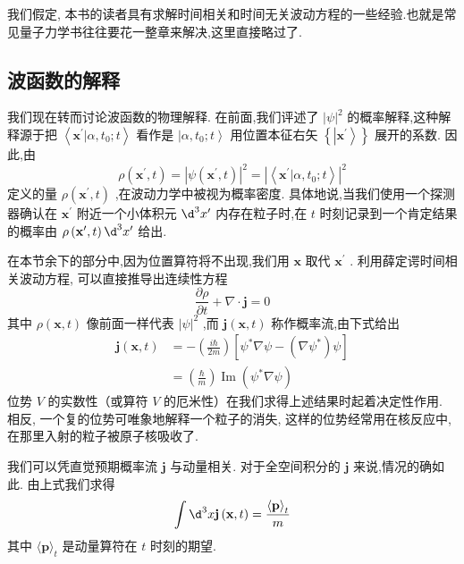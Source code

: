 我们假定, 本书的读者具有求解时间相关和时间无关波动方程的一些经验.也就是常见量子力学书往往要花一整章来解决,这里直接略过了.
\subsection{波函数的解释}
我们现在转而讨论波函数的物理解释. 在前面,我们评述了 ${\left| \psi \right| }^{2}$ 的概率解释,这种解释源于把 $\left\langle {{\mathbf{x}}^{\prime } | \alpha ,{t}_{0};t}\right\rangle$ 看作是 $\left. {| \alpha ,{t}_{0};t}\right\rangle$ 用位置本征右矢 $\left\{ \left| {\mathbf{x}}^{\prime }\right\rangle \right\}$ 展开的系数. 因此,由
\begin{equation}
\rho \left( {{\mathbf{x}}^{\prime }, t}\right) = {\left| \psi \left( {\mathbf{x}}^{\prime }, t\right) \right| }^{2} = {\left| \left\langle {\mathbf{x}}^{\prime } | \alpha ,{t}_{0};t\right\rangle \right| }^{2}
\end{equation}
定义的量 $\rho \left( {{\mathbf{x}}^{\prime }, t}\right)$ ,在波动力学中被视为概率密度. 具体地说,当我们使用一个探测器确认在 ${\mathbf{x}}^{\prime }$ 附近一个小体积元 ${\d}^{3}{x}^{\prime }$ 内存在粒子时,在 $t$ 时刻记录到一个肯定结果的概率由 $\rho \left( {{\mathbf{x}}^{\prime }, t}\right) {\d}^{3}{x}^{\prime }$ 给出.

在本节余下的部分中,因为位置算符将不出现,我们用 $\mathbf{x}$ 取代 ${\mathbf{x}}^{\prime }$ . 利用薛定谔时间相关波动方程, 可以直接推导出连续性方程
\begin{equation}
\frac{\partial \rho }{\partial t} + \nabla \cdot \mathbf{j} = 0
\end{equation}
其中 $\rho \left( {\mathbf{x}, t}\right)$ 像前面一样代表 ${\left| \psi \right| }^{2}$ ,而 $\mathbf{j}\left( {\mathbf{x}, t}\right)$ 称作概率流,由下式给出
\begin{equation}
\begin{aligned}
	\mathbf{j}\left( {\mathbf{x}, t}\right) &= - \left( \frac{i\hbar }{2m}\right) \left\lbrack {{\psi }^{ * }\nabla \psi - \left( {\nabla {\psi }^{ * }}\right) \psi }\right\rbrack\\
	&= \left( \frac{\hbar }{m}\right) \operatorname{Im}\left( {{\psi }^{ * }\nabla \psi }\right)
\end{aligned}
\end{equation}
位势 $V$ 的实数性（或算符 $V$ 的厄米性）在我们求得上述结果时起着决定性作用. 相反, 一个复的位势可唯象地解释一个粒子的消失, 这样的位势经常用在核反应中, 在那里入射的粒子被原子核吸收了.

我们可以凭直觉预期概率流 $\mathbf{j}$ 与动量相关. 对于全空间积分的 $\mathbf{j}$ 来说,情况的确如此. 由上式我们求得
\begin{equation}
\int {\d}^{3}x\mathbf{j}\left( {\mathbf{x}, t}\right) = \frac{\langle \mathbf{p}{\rangle }_{t}}{m}
\end{equation}
其中 $\langle \mathbf{p}{\rangle }_{t}$ 是动量算符在 $t$ 时刻的期望.

